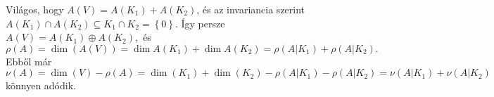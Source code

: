 \documentclass[9pt, a4paper, showtrims]{memoir}
\makeatletter
\renewenvironment{proof}[1][\proofname]
    {\par\pushQED{\qed}%
    \normalfont \topsep6\p@\@plus6\p@\relax
    \trivlist
    \item[\hskip\labelsep
        \itshape
    #1\@addpunct{:}]\ignorespaces}
    {\popQED\endtrivlist\@endpefalse}
\theoremstyle{plain}
\theoremstyle{remark}
\theoremstyle{definition}
\makeatother
\begin{document}
\begin{proof}
    Világos, hogy $A\left( V \right)=A\left( K_1 \right)+A\left( K_2 \right)$, és az
    invariancia szerint $A\left( K_1 \right)\cap A\left( K_2 \right)\subseteq K_1\cap K_2=\left\{ 0 \right\}$.
    Így persze
    \(
    A\left( V \right)=A\left( K_1 \right)\oplus A\left( K_2 \right),
    \)
    és
    \[
        \rho\left( A \right)=
        \dim\left( A\left( V \right) \right)
        =
        \dim A\left( K_1 \right)+
        \dim A\left( K_2 \right)
        =
        \rho\left( A|K_1 \right)+\rho\left( A|K_2 \right).
    \]
    Ebből már
    \[
        \nu\left( A \right)
        =
        \dim\left( V \right)-\rho\left( A \right)
        =\dim\left( K_1 \right)+\dim\left( K_2 \right)-\rho\left( A|K_1 \right)-\rho\left( A|K_2 \right)
        =
        \nu\left( A|K_1 \right)+\nu\left( A|K_2 \right)
    \]
    könnyen adódik.
\end{proof}
\end{document}
